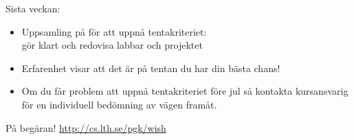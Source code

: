 \newcommand{\legend}[2][]{
    \begin{scope}[#1]
    \path
        \foreach \n/\s in {#2}
            {
                  ++(0,-10pt) node[\s,legend box] {} +(5pt,0) node[legend label] {\n}
            }
    ;
    \end{scope}
}


\ifkompendium\else

\begin{Slide}{Sista veckan:}

  \begin{itemize}
    \item Uppsamling på  för att uppnå tentakriteriet: \\ gör klart och redovisa  labbar och projektet

    \item Erfarenhet visar att det är på   tentan du har din bästa chans! 

    \item Om du får problem att uppnå tentakriteriet före jul så kontakta kursansvarig för en individuell bedömning av vägen framåt.
  \end{itemize}

\end{Slide}




\begin{Slide}{På begäran!}
\url{http://cs.lth.se/pgk/wish}
\end{Slide}





